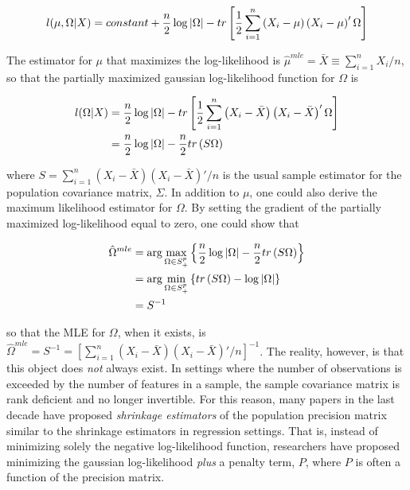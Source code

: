 \documentclass[11pt,]{report}
\theoremstyle{definition}
\theoremstyle{definition}
\theoremstyle{definition}
\theoremstyle{remark}
\begin{document}
\begin{equation}
  l(\mu, \Omega | X) = constant + \frac{n}{2}\log\left| \Omega \right| - tr\left[ \frac{1}{2}\sum_{i = 1}^{n}\left(X_{i} - \mu \right)\left(X_{i} - \mu \right)'\Omega \right]
\label{eq:normalloglik}\notag
\end{equation}

The estimator for \(\mu\) that maximizes the log-likelihood is \(\hat{\mu}^{mle} = \bar{X} \equiv \sum_{i = 1}^{n}X_{i}/n\), so that the partially maximized gaussian log-likelihood function for \(\Omega\) is

\begin{equation}
\begin{split}
  l(\Omega | X) &= \frac{n}{2}\log\left| \Omega \right| - tr\left[ \frac{1}{2}\sum_{i = 1}^{n}\left(X_{i} - \bar{X} \right)\left(X_{i} - \bar{X} \right)'\Omega \right] \\
  &= \frac{n}{2}\log\left| \Omega \right| - \frac{n}{2}tr\left( S\Omega \right)
\end{split}
\label{eq:partialmaxloglik}\notag
\end{equation}

where \(S = \sum_{i = 1}^{n}\left(X_{i} - \bar{X}\right)\left(X_{i} - \bar{X}\right)'/n\) is the usual sample estimator for the population covariance matrix, \(\Sigma\). In addition to \(\mu\), one could also derive the maximum likelihood estimator for \(\Omega\). By setting the gradient of the partially maximized log-likelihood equal to zero, one could show that

\begin{equation}
\begin{split}
\hat{\Omega}^{mle} &= \arg\max_{\Omega \in S_{+}^{p}}\left\{ \frac{n}{2}\log\left| \Omega \right| - \frac{n}{2}tr\left(S\Omega \right) \right\} \\
  &= \arg\min_{\Omega \in S_{+}^{p}}\left\{ tr\left(S\Omega\right) - \log\left|\Omega\right| \right\} \\
  &= S^{-1}
\end{split}
\label{eq:omegamle}\notag
\end{equation}

so that the MLE for \(\Omega\), when it exists, is \(\hat{\Omega}^{mle} = S^{-1} = \left[\sum_{i = 1}^{n}\left(X_{i} - \bar{X}\right)\left(X_{i} - \bar{X}\right)'/n \right]^{-1}\). The reality, however, is that this object does \emph{not} always exist. In settings where the number of observations is exceeded by the number of features in a sample, the sample covariance matrix is rank deficient and no longer invertible. For this reason, many papers in the last decade have proposed \emph{shrinkage estimators} of the population precision matrix similar to the shrinkage estimators in regression settings. That is, instead of minimizing solely the negative log-likelihood function, researchers have proposed minimizing the gaussian log-likelihood \emph{plus} a penalty term, \(P\), where \(P\) is often a function of the precision matrix.
\end{document}
